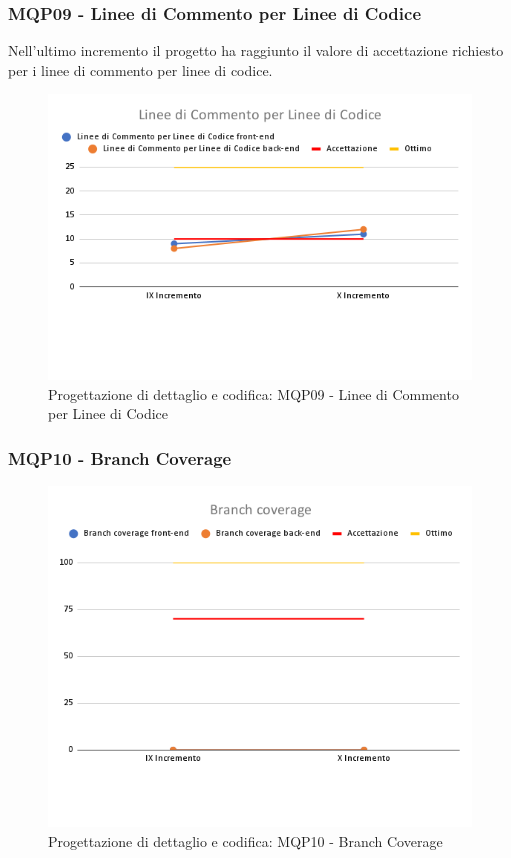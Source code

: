 \subsubsection{MQP09 - Linee di Commento per Linee di Codice}
Nell'ultimo incremento il progetto ha raggiunto il valore di accettazione richiesto per i linee di commento per linee di codice.
\begin{figure}[H]
    \centering
    \includegraphics[scale=0.50]{Sezioni/images/last_prodotto/Linee_di_Commento_per Linee_di_Codice.png}
    \caption{Progettazione di dettaglio e codifica: MQP09 - Linee di Commento per Linee di Codice}
\end{figure}
\subsubsection{MQP10 - Branch Coverage}
\begin{figure}[H]
    \centering
    \includegraphics[scale=0.50]{Sezioni/images/last_prodotto/Branch_coverage.png}
    \caption{Progettazione di dettaglio e codifica: MQP10 - Branch Coverage}
\end{figure}
